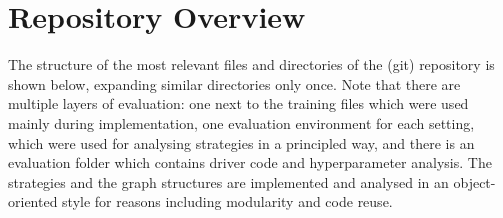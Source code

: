 \section{Repository Overview}

The structure of the most relevant files and directories of the (git) repository is shown below, expanding similar directories only once. Note that there are multiple layers of evaluation: one next to the training files which were used mainly during implementation, one evaluation environment for each setting, which were used for analysing strategies in a principled way, and there is an evaluation folder which contains driver code and hyperparameter analysis. The strategies and the graph structures are implemented and analysed in an object-oriented style for reasons including modularity and code reuse.



